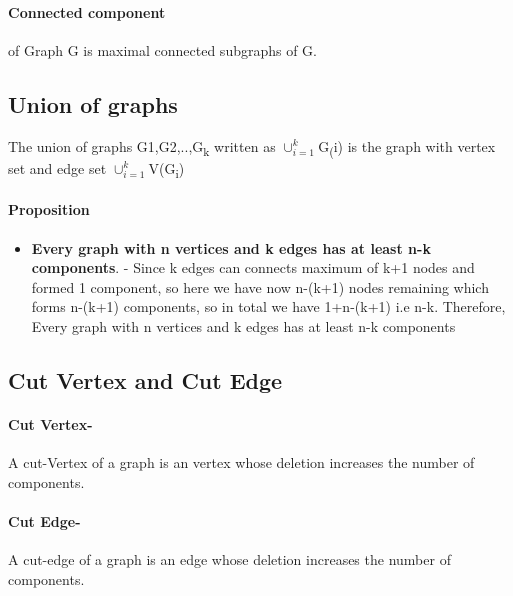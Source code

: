 \paragraph{Connected component} of Graph G is maximal connected
subgraphs of G.


\subsection{Union of graphs}
The union of graphs G1,G2,..,G\textsubscript{k} written as \(\cup_{i=1}^k \)G\textsubscript(i) is the graph
with vertex set and edge set \(\cup_{i=1}^k \)V(G\textsubscript{i})

\paragraph{Proposition}
\begin{itemize}
    \item \textbf{Every graph with n vertices and k edges has
    at least n-k components}. - Since k edges can connects maximum of k+1 nodes and formed 1 component, 
    so here we have now n-(k+1) nodes remaining which forms n-(k+1) components, so in total we have 1+n-(k+1)
    i.e n-k. Therefore, Every graph with n vertices and k edges has
    at least n-k components
\end{itemize}

\subsection{Cut Vertex and Cut Edge}
\paragraph{Cut Vertex-}A cut-Vertex of a graph is an vertex whose deletion
increases the number of components.

\paragraph{Cut Edge-}A cut-edge of a graph is an edge whose deletion
increases the number of components.


